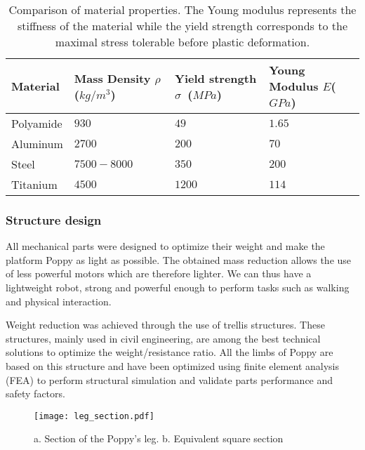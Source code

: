 \begin{table}[h]
    \centering
    \begin{tabularx}{0.8\linewidth }{l X X X}
        Material & Mass Density $\rho$ ($kg/m^3$) &  Yield strength $\sigma$~($MPa$) & Young Modulus $E$($GPa$)\\
        \hline
        Polyamide & $930$ & $49$ & $1.65$\\

        Aluminum & $2700$ & $200$ & $70$\\

        Steel & $7500-8000$ & $350$ & $200$\\

        Titanium & $4500$ & $1200$ & $114$\\

    \end{tabularx}

    \caption{Comparison of material properties.
    The Young modulus represents the stiffness of the material while the yield strength corresponds to the maximal stress tolerable before plastic deformation.}
    \label{tab:materials}
\end{table}




\subsubsection{Structure design} %
\label{ssub:structure_design}


All mechanical parts were designed to optimize their weight and make the platform Poppy as light as possible.
The obtained mass reduction allows the use of less powerful motors which are therefore lighter.
We can thus have a lightweight robot, strong and powerful enough to perform tasks such as walking and physical interaction.

Weight reduction was achieved through the use of trellis structures.
These structures, mainly used in civil engineering, are among the best technical solutions to optimize the weight/resistance ratio.
All the limbs of Poppy are based on this structure and have been optimized using finite element analysis (FEA) to perform structural simulation and validate parts performance and safety factors.

\begin{figure}[thpb]
    \centering
    \texttt{[image: leg\_section.pdf]}
    \caption{a.
    Section of the Poppy's leg.
    b.
    Equivalent square section}
    \label{fig:leg_section}
\end{figure}


